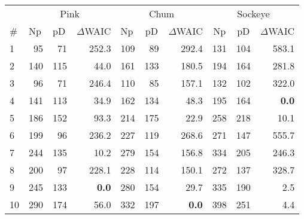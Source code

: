\begin{tabular}{lrrrrrrrrr}
  \hline
  \multicolumn{1}{r}{} &
            \multicolumn{3}{c}{Pink} &
            \multicolumn{3}{c}{Chum} &
            \multicolumn{3}{c}{Sockeye} \\ 
  \cmidrule(lr){2-4} \cmidrule(lr){5-7} \cmidrule(lr){8-10} 
  \multicolumn{1}{l}{\#} & 
    \multicolumn{1}{l}{Np} & 
    \multicolumn{1}{l}{pD} & 
    \multicolumn{1}{l}{$\Delta$WAIC} & 
    \multicolumn{1}{l}{Np} & 
    \multicolumn{1}{c}{pD} & 
    \multicolumn{1}{c}{$\Delta$WAIC} & 
    \multicolumn{1}{c}{Np} & 
    \multicolumn{1}{c}{pD} & 
    \multicolumn{1}{l}{$\Delta$WAIC} \\ 
  \cmidrule{1-10} 
1 & 95 & 71 & 252.3 & 109 & 89 & 292.4 & 131 & 104 & 583.1 \\ 
  2 & 140 & 115 & 44.0 & 161 & 133 & 180.5 & 194 & 164 & 281.8 \\ 
  3 & 96 & 71 & 246.4 & 110 & 85 & 157.1 & 132 & 102 & 322.0 \\ 
  4 & 141 & 113 & 34.9 & 162 & 134 & 48.3 & 195 & 164 & \textbf{0.0} \\ 
  5 & 186 & 152 & 93.3 & 214 & 175 & 22.9 & 258 & 218 & 10.1 \\ 
  6 & 199 & 96 & 236.2 & 227 & 119 & 268.6 & 271 & 147 & 555.7 \\ 
  7 & 244 & 135 & 10.2 & 279 & 154 & 156.8 & 334 & 205 & 246.3 \\ 
  8 & 200 & 97 & 228.1 & 228 & 114 & 150.1 & 272 & 137 & 328.7 \\ 
  9 & 245 & 133 & \textbf{0.0} & 280 & 154 & 29.7 & 335 & 190 & 2.5 \\ 
  10 & 290 & 174 & 56.0 & 332 & 197 & \textbf{0.0} & 398 & 251 & 4.4 \\ 
   \hline
\end{tabular}
